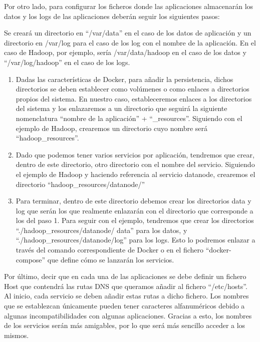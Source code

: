 Por otro lado, para configurar los ficheros donde las aplicaciones almacenarán los datos y los logs de las aplicaciones deberán seguir los siguientes pasos:

Se creará un directorio en “/var/data” en el caso de los datos de aplicación y un directorio en /var/log para el caso de los log con el nombre de la aplicación. En el caso de Hadoop, por ejemplo, sería     /var/data/hadoop en el caso de los datos y “/var/log/hadoop” en el caso de los logs.
\begin{enumerate}

\item Dadas las características de Docker, para añadir la persistencia, dichos directorios se deben establecer como volúmenes o como enlaces a directorios propios del sistema. En nuestro caso, estableceremos enlaces a los directorios del sistema y los enlazaremos a un directorio que seguirá la siguiente nomenclatura “nombre de la aplicación” + “\_resources”. Siguiendo con el ejemplo de Hadoop, crearemos un directorio cuyo nombre será     “hadoop\_resources”.

\item Dado que podemos tener varios servicios por aplicación, tendremos que crear, dentro de este directorio, otro directorio con el nombre del servicio. Siguiendo el ejemplo de Hadoop y haciendo referencia al servicio datanode, crearemos el directorio “hadoop\_resources/datanode/”

\item Para terminar, dentro de este directorio debemos crear los directorios data y log que serán los que realmente enlazarán con el directorio que corresponde a los del paso 1. Para seguir con el ejemplo, tendremos que crear los directorios “./hadoop\_resources/datanode/ data” para los datos, y “./hadoop\_resources/datanode/log” para los logs. Esto lo podremos enlazar a través del comando correspondiente de Docker o en el fichero “docker-compose” que define cómo se lanzarán los servicios.

\end{enumerate}

Por último, decir que en cada una de las aplicaciones se debe definir un fichero Host que contendrá las rutas DNS que queramos añadir al fichero “/etc/hosts”. Al inicio, cada servicio se deben añadir estas rutas a dicho fichero. Los nombres que se establezcan únicamente pueden tener caracteres alfanuméricos debido a algunas incompatibilidades con algunas aplicaciones. Gracias a esto, los nombres de los servicios serán más amigables, por lo que será más sencillo acceder a los mismos.


